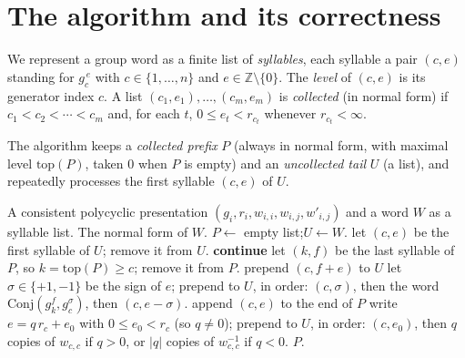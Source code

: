 \documentclass{amsart}
\theoremstyle{definition}
\begin{document}
\section{The algorithm and its correctness}\label{sec:alg}

We represent a group word as a finite list of \emph{syllables}, each syllable a pair $(c,e)$
standing for $g_c^{\,e}$ with $c\in\{1,\dots,n\}$ and $e\in\mathbb Z\setminus\{0\}$. The
\emph{level} of $(c,e)$ is its generator index $c$. A list $(c_1,e_1),\dots,(c_m,e_m)$ is
\emph{collected} (in normal form) if $c_1<c_2<\cdots<c_m$ and, for each $t$, $0\le
e_t<r_{c_t}$ whenever $r_{c_t}<\infty$.

The algorithm keeps a \emph{collected prefix} $P$ (always in normal form, with maximal level
$\mathrm{top}(P)$, taken $0$ when $P$ is empty) and an \emph{uncollected tail} $U$ (a list),
and repeatedly processes the first syllable $(c,e)$ of $U$.

\begin{algorithm}[h]
\caption{Collection from the left}\label{alg:collect}
\begin{algorithmic}[1]
\Require A consistent polycyclic presentation $(g_i,r_i,w_{i,i},w_{i,j},w'_{i,j})$ and a
word $W$ as a syllable list.
\Ensure The normal form of $W$.
\State $P\gets$ empty list;\quad $U\gets W$.
  \State let $(c,e)$ be the first syllable of $U$; remove it from $U$.
   \State \textbf{continue} \EndIf
  \label{ln:swap}
     \State let $(k,f)$ be the last syllable of $P$, so $k=\mathrm{top}(P)\ge c$; remove it
     from $P$.
      \State prepend $(c,f+e)$ to $U$ 
     \Else {}
        \State let $\sigma\in\{+1,-1\}$ be the sign of $e$;
        \State prepend to $U$, in order: $(c,\sigma)$, then the word $\mathrm{Conj}(g_k^{f},g_c^{\sigma})$,
        then $(c,e-\sigma)$.\label{ln:swapprepend}
     \EndIf
  \label{ln:place}
     \State append $(c,e)$ to the end of $P$ 
  \Else {}\label{ln:power}
     \State write $e=q\,r_c+e_0$ with $0\le e_0<r_c$ (so $q\ne0$);
     \State prepend to $U$, in order: $(c,e_0)$, then $q$ copies of $w_{c,c}$ if $q>0$, or
     $|q|$ copies of $w_{c,c}^{-1}$ if $q<0$.\label{ln:powerprepend}
  \EndIf
\EndWhile
\State \Return $P$.
\end{algorithmic}
\end{algorithm}
\end{document}
